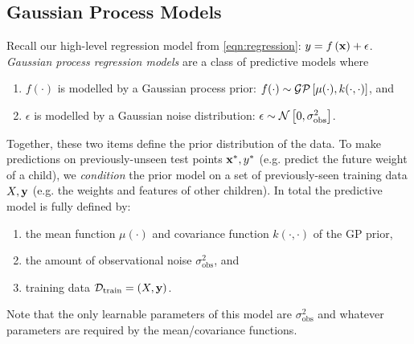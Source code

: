 \subsection{Gaussian Process Models}
Recall our high-level regression model from \autoref{eqn:regression}: $y = f \left( \mathbf{x} \right) + \epsilon$.
\emph{Gaussian process regression models} are a class of predictive models where
%
\begin{enumerate}
  \item $f ( \cdot )$ is modelled by a Gaussian process prior: $f (\cdot) \sim \mathcal{GP} \left[ \mu(\cdot), k(\cdot, \cdot) \right]$, and
  \item $\epsilon$ is modelled by a Gaussian noise distribution: $\epsilon \sim \mathcal{N} \left[ 0, \sigma_\text{obs}^2 \right]$.
\end{enumerate}
%
Together, these two items define the prior distribution of the data.
To make predictions on previously-unseen test points $\mathbf{x}^*, y^*$ (e.g. predict the future weight of a child), we \emph{condition} the prior model on a set of previously-seen training data $X, \mathbf{y}$ (e.g. the weights and features of other children).
In total the predictive model is fully defined by:
\begin{enumerate}
  \item the mean function $\mu(\cdot)$ and covariance function $k(\cdot, \cdot)$ of the GP prior,
  \item the amount of observational noise $\sigma_\text{obs}^2$, and
  \item training data $\mathcal D_\text{train} = (X, \mathbf{y})$.
\end{enumerate}
%
Note that the only learnable parameters of this model are $\sigma_\text{obs}^2$ and whatever parameters are required by the mean/covariance functions.

